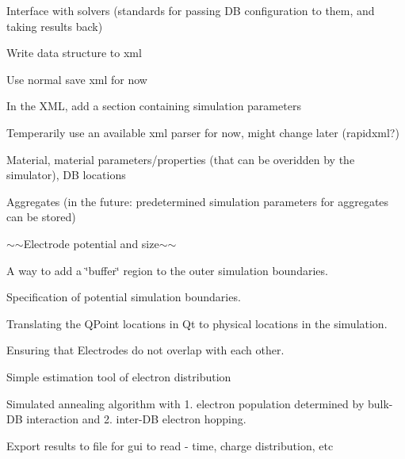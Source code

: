 \begin{DoxyItemize}
\item Interface with solvers (standards for passing DB configuration to them, and taking results back)
\begin{DoxyItemize}
\item Write data structure to xml
\begin{DoxyItemize}
\item Use normal save xml for now
\item In the X\+ML, add a section containing simulation parameters
\item Temperarily use an available xml parser for now, might change later (rapidxml?)
\item Material, material parameters/properties (that can be overidden by the simulator), DB locations
\item Aggregates (in the future\+: predetermined simulation parameters for aggregates can be stored)
\begin{DoxyItemize}
\item $\sim$$\sim$\+Electrode potential and size$\sim$$\sim$
\item A way to add a \char`\"{}buffer\char`\"{} region to the outer simulation boundaries.
\item Specification of potential simulation boundaries.
\item Translating the Q\+Point locations in Qt to physical locations in the simulation.
\item Ensuring that Electrodes do not overlap with each other.
\end{DoxyItemize}
\end{DoxyItemize}
\end{DoxyItemize}
\item Simple estimation tool of electron distribution
\begin{DoxyItemize}
\item Simulated annealing algorithm with 1. electron population determined by bulk-\/\+DB interaction and 2. inter-\/\+DB electron hopping.
\item Export results to file for gui to read -\/ time, charge distribution, etc
\end{DoxyItemize}
\end{DoxyItemize}

